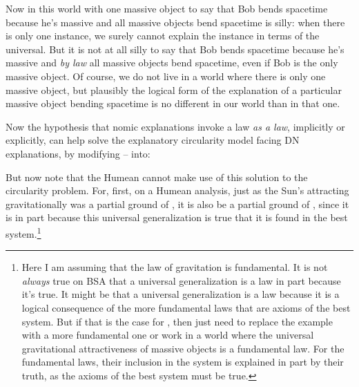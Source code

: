 Now in this world with one massive object to say that Bob bends spacetime because he's massive and all massive objects bend spacetime 
is silly: when there is only one instance, we surely cannot explain the instance in terms of the universal.
But it is not at all silly to say that Bob bends spacetime because he's massive and \textit{by law} all massive objects bend
spacetime,  even if Bob is the only massive object. Of course, we do not live in a world where there is only one massive object, but plausibly the logical form of the explanation of a particular massive object bending spacetime is no different in 
our world than in that one.

Now the hypothesis that nomic explanations invoke a law \textit{as a law}, implicitly or explicitly, can help solve the explanatory 
circularity model facing DN explanations, by modifying -- into:

But now note that the Humean cannot make use of this solution to the circularity problem. For, first, on a Humean analysis, just as 
the Sun's attracting gravitationally was a partial ground of , it is also be a partial ground of , 
since it is in part because this universal generalization is true that it is found in the best 
system.\footnote{Here I am assuming that the law of gravitation is fundamental. It is not \textit{always} true on BSA that a universal generalization is a law in part because it's true. 
It might be that a universal generalization is a law because it is a logical consequence of the more fundamental laws that are axioms of the 
best system. But if that is the case for , then just need to replace the example with a more fundamental one or work 
in a world where the universal gravitational attractiveness of massive objects is a fundamental law. For the 
fundamental laws, their inclusion in the system is explained in part by their truth, as the axioms of the best system must
be true.} 

